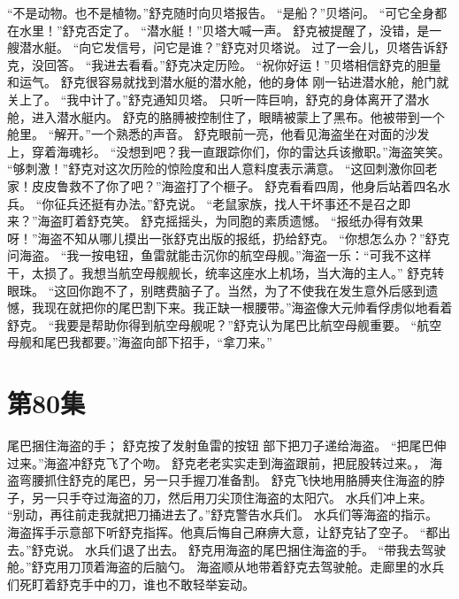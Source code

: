 \documentclass[a4paper,12pt,UTF8,twoside]{ctexbook}
\begin{document}
        “不是动物。也不是植物。”舒克随时向贝塔报告。 
        “是船？”贝塔问。 
        “可它全身都在水里！”舒克否定了。 
        “潜水艇！”贝塔大喊一声。 
        舒克被提醒了，没错，是一艘潜水艇。 
        “向它发信号，问它是谁？”舒克对贝塔说。 
        过了一会儿，贝塔告诉舒克，没回答。 
        “我进去看看。”舒克决定历险。 
        “祝你好运！”贝塔相信舒克的胆量和运气。 
        舒克很容易就找到潜水艇的潜水舱，他的身体 
        刚一钻进潜水舱，舱门就关上了。 
        “我中计了。”舒克通知贝塔。 
        只听一阵巨响，舒克的身体离开了潜水舱，进入潜水艇内。 
        舒克的胳膊被控制住了，眼睛被蒙上了黑布。他被带到一个舱里。 
        “解开。”一个熟悉的声音。 
        舒克眼前一亮，他看见海盗坐在对面的沙发上，穿着海魂衫。 
        “没想到吧？我一直跟踪你们，你的雷达兵该撤职。”海盗笑笑。 
        “够刺激！”舒克对这次历险的惊险度和出人意料度表示满意。 
        “这回刺激你回老家！皮皮鲁救不了你了吧？”海盗打了个榧子。 
        舒克看看四周，他身后站着四名水兵。 
        “你征兵还挺有办法。”舒克说。 
        “老鼠家族，找人干坏事还不是召之即来？”海盗盯着舒克笑。 
        舒克摇摇头，为同胞的素质遗憾。 
        “报纸办得有效果呀！”海盗不知从哪儿摸出一张舒克出版的报纸，扔给舒克。 
        “你想怎么办？”舒克问海盗。 
        “我一按电钮，鱼雷就能击沉你的航空母舰。”海盗一乐：“可我不这样干，太损了。我想当航空母舰舰长，统率这座水上机场，当大海的主人。” 
        舒克转眼珠。 
        “这回你跑不了，别瞎费脑子了。当然，为了不使我在发生意外后感到遗憾，我现在就把你的尾巴割下来。我正缺一根腰带。”海盗像大元帅看俘虏似地看着舒克。 
        “我要是帮助你得到航空母舰呢？”舒克认为尾巴比航空母舰重要。 
        “航空母舰和尾巴我都要。”海盗向部下招手，“拿刀来。”   \chapter{第80集} 
        尾巴捆住海盗的手； 
        舒克按了发射鱼雷的按钮   
        部下把刀子递给海盗。 
        “把尾巴伸过来。”海盗冲舒克飞了个吻。 
        舒克老老实实走到海盗跟前，把屁股转过来。， 
        海盗弯腰抓住舒克的尾巴，另一只手握刀准备割。 
        舒克飞快地用胳膊夹住海盗的脖子，另一只手夺过海盗的刀，然后用刀尖顶住海盗的太阳穴。 
        水兵们冲上来。 
        “别动，再往前走我就把刀捅进去了。”舒克警告水兵们。 
        水兵们等海盗的指示。 
        海盗挥手示意部下听舒克指挥。他真后悔自己麻痹大意，让舒克钻了空子。 
        “都出去。”舒克说。 
        水兵们退了出去。 
        舒克用海盗的尾巴捆住海盗的手。 
        “带我去驾驶舱。”舒克用刀顶着海盗的后脑勺。 
        海盗顺从地带着舒克去驾驶舱。走廊里的水兵们死盯着舒克手中的刀，谁也不敢轻举妄动。 
\end{document}
